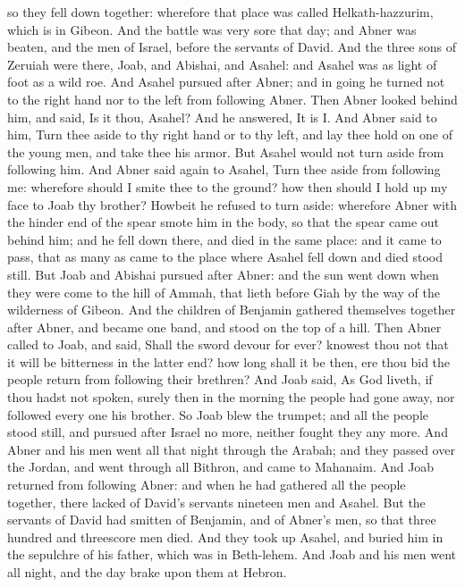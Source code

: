 so they fell down together: wherefore that place was called Helkath-hazzurim, which is in Gibeon. And the battle was very sore that day; and Abner was beaten, and the men of Israel, before the servants of David.  And the three sons of Zeruiah were there, Joab, and Abishai, and Asahel: and Asahel was as light of foot as a wild roe. And Asahel pursued after Abner; and in going he turned not to the right hand nor to the left from following Abner. Then Abner looked behind him, and said, Is it thou, Asahel? And he answered, It is I. And Abner said to him, Turn thee aside to thy right hand or to thy left, and lay thee hold on one of the young men, and take thee his armor. But Asahel would not turn aside from following him. And Abner said again to Asahel, Turn thee aside from following me: wherefore should I smite thee to the ground? how then should I hold up my face to Joab thy brother? Howbeit he refused to turn aside: wherefore Abner with the hinder end of the spear smote him in the body, so that the spear came out behind him; and he fell down there, and died in the same place: and it came to pass, that as many as came to the place where Asahel fell down and died stood still.  But Joab and Abishai pursued after Abner: and the sun went down when they were come to the hill of Ammah, that lieth before Giah by the way of the wilderness of Gibeon. And the children of Benjamin gathered themselves together after Abner, and became one band, and stood on the top of a hill. Then Abner called to Joab, and said, Shall the sword devour for ever? knowest thou not that it will be bitterness in the latter end? how long shall it be then, ere thou bid the people return from following their brethren? And Joab said, As God liveth, if thou hadst not spoken, surely then in the morning the people had gone away, nor followed every one his brother. So Joab blew the trumpet; and all the people stood still, and pursued after Israel no more, neither fought they any more. And Abner and his men went all that night through the Arabah; and they passed over the Jordan, and went through all Bithron, and came to Mahanaim.  And Joab returned from following Abner: and when he had gathered all the people together, there lacked of David’s servants nineteen men and Asahel. But the servants of David had smitten of Benjamin, and of Abner’s men, so that three hundred and threescore men died. And they took up Asahel, and buried him in the sepulchre of his father, which was in Beth-lehem. And Joab and his men went all night, and the day brake upon them at Hebron. 


